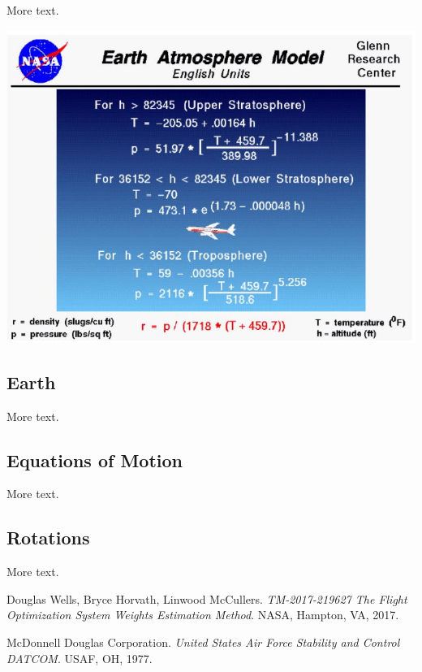 \documentclass[11pt]{article} %
\begin{document}
More text.
\begin{center}
    \includegraphics[width=1\textwidth]{atmosphere}
\end{center}

\subsection{Earth}

More text.

\subsection{Equations of Motion}

More text.

\subsection{Rotations}

More text.

\pagebreak

\begin{thebibliography}{9}
Douglas Wells, Bryce Horvath, Linwood McCullers. 
\textit{TM-2017-219627 The Flight Optimization System Weights Estimation Method}. 
NASA, Hampton, VA, 2017.

McDonnell Douglas Corporation. 
\textit{United States Air Force Stability and Control DATCOM}. 
USAF, OH, 1977.
\end{thebibliography}
\end{document}
